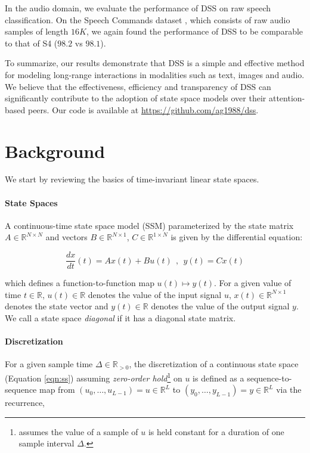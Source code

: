 In the audio domain, we evaluate the performance of DSS on raw speech classification. On the Speech Commands dataset \cite{Warden2018SpeechCA}, which consists of raw audio samples of length $16K$, we again found the performance of DSS to be comparable to that of S4 ($98.2$ vs $98.1$).

To summarize, our results demonstrate that DSS is a simple and effective method for modeling long-range interactions in modalities such as text, images and audio. We believe that the effectiveness, efficiency and transparency of DSS can significantly contribute to the adoption of state space models over their attention-based peers. Our code is available at \url{https://github.com/ag1988/dss}.

\section{Background}\label{sec:background}

We start by reviewing the basics of time-invariant linear state spaces.

\paragraph{State Spaces} A continuous-time state space model (SSM) parameterized by the state matrix $A \in \mathbb{R}^{N \times N}$ and vectors $B \in \mathbb{R}^{N \times 1}$, $C \in \mathbb{R}^{1 \times N}$ is given by the differential equation:

\begin{equation}\label{eqn:ss}
\frac{dx}{dt}(t) = Ax(t) + Bu(t)\ \ ,\ \ y(t) = Cx(t) 
\end{equation}

which defines a function-to-function map $u(t) \mapsto y(t)$. For a given value of time $t \in \mathbb{R}$, $u(t) \in \mathbb{R}$ denotes the value of the input signal $u$, $x(t) \in \mathbb{R}^{N \times 1}$ denotes the state vector and $y(t) \in \mathbb{R}$ denotes the value of the output signal $y$. We call a state space \emph{diagonal} if it has a diagonal state matrix.

\paragraph{Discretization} For a given sample time $\Delta \in \mathbb{R}_{> 0}$, the discretization of a continuous state space (Equation \ref{eqn:ss}) assuming \emph{zero-order hold}\footnote{assumes the value of a sample of $u$ is held constant for a duration of one sample interval $\Delta$.} on $u$ is defined as a sequence-to-sequence map from $(u_0,\ldots,u_{L-1}) = u \in \mathbb{R}^L$ to $(y_0,\ldots,y_{L-1}) = y \in \mathbb{R}^L$ via the recurrence,

